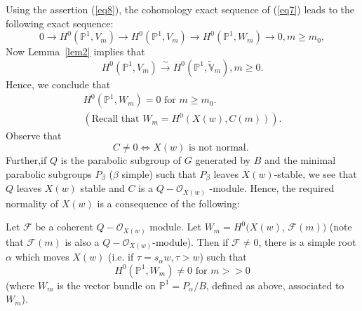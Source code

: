 \begin{rem}
Using the assertion (\ref{eq8}), the cohomology exact sequence of (\ref{eq7}) leads to the following exact sequence: 
\begin{equation*}\label{eq10}
0\to H^{0}\left(\mathbb{P}^{1}, V_{m}\right)\to H^{0}\left(\mathbb{P}^{1}, V_{m}\right)\to H^{0}\left(\mathbb{P}^{1}, W_m\right)\to 0, m\geq m_0, \tag{10}
\end{equation*}
Now Lemma~\ref{lem2} implies that 
\begin{equation*}
H^{0}\left(\mathbb{P}^{1}, V_m\right)\xrightarrow{\sim} H^{0}\left(\mathbb{P}^{1}, \widetilde{\mathbb{V}}_m\right), m\geq 0. 
\end{equation*}
Hence, we conclude that 
\begin{gather*}
H^{0}\left(\mathbb{P}^{1}, W_m\right)=0 \text{ for } m\geq m_0.\\
(\text{Recall that } W_m=H^{0} (X(w), C(m))). 
\end{gather*}
Observe that 
\begin{equation*}
C\neq 0 \Leftrightarrow X(w) \text{ is not normal. }
\end{equation*}
Further,\pageoriginale if $Q$ is the parabolic subgroup of $G$ generated by $B$ and the minimal parabolic subgroups $P_{\beta}$ ($\beta$ simple) such that $P_{\beta}$ leaves $X(w)$-stable, we see that $Q$ leaves $X(w)$ stable and $C$ is a $Q-\mathscr{O}_{X(w)}$ -module. Hence, the required normality of $X(w)$ is a consequence of the following: 
\end{rem}

\begin{lem}\label{lem3}
Let $\mathscr{F}$ be a coherent $Q-\mathscr{O}_{X(w)} $ module. Let $W_m=H^{0}(X(w)$, $\mathscr{F}(m))$ (note that $\mathscr{F}(m)$ is also a $Q-\mathscr{O}_{X(w)}$-module). Then if $\mathscr{F}\neq 0$, there is a simple root $\alpha$ which moves $X(w)$ (i.e. if $\tau=s_{\alpha}w, \tau >w$) such that 
$$
H^{0}\left(\mathbb{P}^{1}, W_m\right)\neq 0 \text{ for } m>> 0
$$
(where $W_m$ is the vector bundle on $\mathbb{P}^{1}=P_{\alpha}/B$, defined as above, associated to $W_m$). 
\end{lem}

